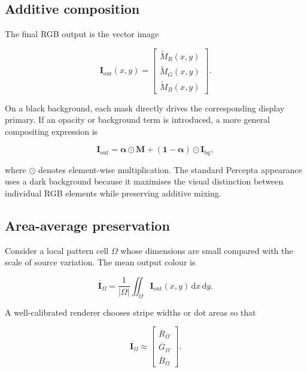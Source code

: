 \subsection{Additive composition}

The final RGB output is the vector image

\begin{equation}
\mathbf{I}_{\mathrm{out}}(x,y)=
\begin{bmatrix}
\widetilde{M}_R(x,y)\\[1mm]
\widetilde{M}_G(x,y)\\[1mm]
\widetilde{M}_B(x,y)
\end{bmatrix}.
\label{eq:additive}
\end{equation}

On a black background, each mask directly drives the corresponding display primary. If an opacity or background term is introduced, a more general compositing expression is

\begin{equation}
\mathbf{I}_{\mathrm{out}}=
\boldsymbol{\alpha}\odot\mathbf{M}
+\left(\mathbf{1}-\boldsymbol{\alpha}\right)\odot\mathbf{I}_{\mathrm{bg}},
\end{equation}

where $\odot$ denotes element-wise multiplication. The standard Percepta appearance uses a dark background because it maximises the visual distinction between individual RGB elements while preserving additive mixing.

\subsection{Area-average preservation}

Consider a local pattern cell $\Omega$ whose dimensions are small compared with the scale of source variation. The mean output colour is

\begin{equation}
\overline{\mathbf{I}}_{\Omega}
=
\frac{1}{|\Omega|}
\iint_{\Omega}
\mathbf{I}_{\mathrm{out}}(x,y)\,\mathrm{d}x\,\mathrm{d}y.
\label{eq:localmean}
\end{equation}

A well-calibrated renderer chooses stripe widths or dot areas so that

\begin{equation}
\overline{\mathbf{I}}_{\Omega}
\approx
\begin{bmatrix}
\overline{R}_{\Omega}\\[1mm]
\overline{G}_{\Omega}\\[1mm]
\overline{B}_{\Omega}
\end{bmatrix}.
\label{eq:preserve}
\end{equation}

